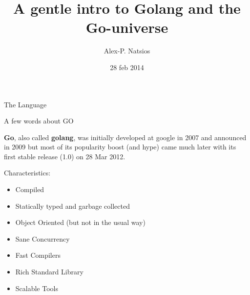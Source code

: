 \documentclass{beamer}
\title{A gentle intro to Golang and the Go-universe}
\author{Alex-P. Natsios}
\institute{GoCode.Thessaly(7)}
\date{28 feb 2014}
\begin{document}
    \begin{frame}
       \titlepage
    \end{frame}

    \begin{frame}
        \center\huge The Language
    \end{frame}

    \begin{frame}{A few words about GO}

        {\bf Go}, also called {\bf golang}, was initially developed at google in 2007 and
        announced in 2009 but most of its popularity boost (and hype) came
        much later with its first stable release (1.0) on 28 Mar 2012.

        \begin{block}{Characteristics:}
            \begin{itemize}
                \item Compiled
                \item Statically typed and garbage collected
                \item Object Oriented (but not in the usual way)
                \item Sane Concurrency
                \item Fast Compilers
                \item Rich Standard Library
                \item Scalable Tools
            \end{itemize}
        \end{block}
    \end{frame}
\end{document}
